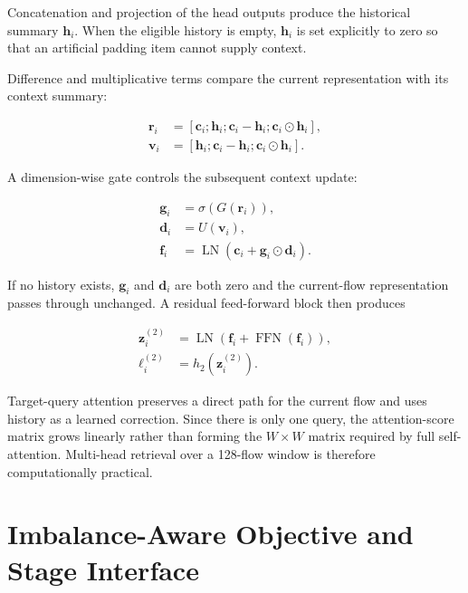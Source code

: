 \documentclass[11pt,fleqn]{report}
\begin{document}
Concatenation and projection of the head outputs produce the historical summary $\mathbf{h}_i$. When the eligible history is empty, $\mathbf{h}_i$ is set explicitly to zero so that an artificial padding item cannot supply context.

Difference and multiplicative terms compare the current representation with its context summary:

\begin{align}
    \mathbf{r}_i
    &=[\mathbf{c}_i;\mathbf{h}_i;
       \mathbf{c}_i-\mathbf{h}_i;
       \mathbf{c}_i\odot\mathbf{h}_i],\\
    \mathbf{v}_i
    &=[\mathbf{h}_i;
       \mathbf{c}_i-\mathbf{h}_i;
       \mathbf{c}_i\odot\mathbf{h}_i].
    \label{eq:target_context_interactions}
\end{align}

A dimension-wise gate controls the subsequent context update:

\begin{align}
    \mathbf{g}_i&=\sigma(G(\mathbf{r}_i)),\\
    \mathbf{d}_i&=U(\mathbf{v}_i),\\
    \mathbf{f}_i&=\operatorname{LN}
      \left(\mathbf{c}_i+\mathbf{g}_i\odot\mathbf{d}_i\right).
    \label{eq:gated_context_update}
\end{align}

If no history exists, $\mathbf{g}_i$ and $\mathbf{d}_i$ are both zero and the current-flow representation passes through unchanged. A residual feed-forward block then produces

\begin{align}
    \mathbf{z}^{(2)}_i
    &=\operatorname{LN}
      \left(
        \mathbf{f}_i+\operatorname{FFN}(\mathbf{f}_i)
      \right),\\
    \boldsymbol{\ell}^{(2)}_i
    &=h_2(\mathbf{z}^{(2)}_i).
    \label{eq:stage2_output}
\end{align}

Target-query attention preserves a direct path for the current flow and uses history as a learned correction. Since there is only one query, the attention-score matrix grows linearly rather than forming the $W\times W$ matrix required by full self-attention. Multi-head retrieval over a 128-flow window is therefore computationally practical.
\section{Imbalance-Aware Objective and Stage Interface}
\label{subsec:method_training}
\end{document}
